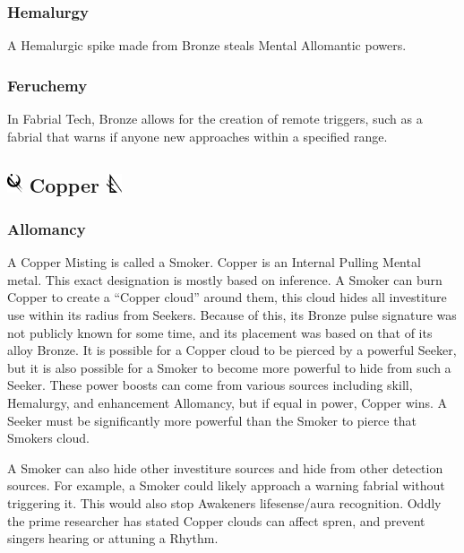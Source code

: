 \documentclass[conference]{IEEEtran}
\begin{document}
\subsubsection*{\textbf{Hemalurgy}}
A Hemalurgic spike made from Bronze steals Mental Allomantic powers.\cite{HE-TB}\\
\subsubsection*{\textbf{Feruchemy}}
In Fabrial Tech, Bronze allows for the creation of remote triggers,\cite{RoW-E8}  such as a fabrial that warns if anyone new approaches within a specified range.\cite{WoR-I4}\clearpage
\subsection*{\includegraphics[height=1em]{images/Copper.png}  \textbf{Copper} \includegraphics[height=1em]{images/Copper_(Feruchemy).png}}
\subsubsection*{\textbf{Allomancy}}
A Copper Misting is called a Smoker.\cite{ARS}  Copper is an Internal Pulling Mental metal.\cite{AL-TB}  This exact designation is mostly based on inference.  A Smoker can burn Copper to create a ``Copper cloud'' around them, this cloud hides all investiture use within its radius from Seekers.\cite{ARS}  Because of this, its Bronze pulse signature was not publicly known for some time, and its placement was based on that of its alloy Bronze.\cite{TFE-CH20}\cite{TFE-CH7}
It is possible for a Copper cloud to be pierced by a powerful Seeker,\cite{TFE-CH31} but it is also possible for a Smoker to become more powerful to hide from such a Seeker.\cite{TFE-CH31}  These power boosts can come from various sources including skill, Hemalurgy, and enhancement Allomancy, but if equal in power, Copper wins.  A Seeker must be significantly more powerful than the Smoker to pierce that Smokers cloud.\cite{TFE-CH31}

A Smoker can also hide other investiture sources and hide from other detection sources.\cite{seeker-spren}  For example, a Smoker could likely approach a warning fabrial without triggering it.  This would also stop Awakeners lifesense/aura recognition.\cite{life-block}  Oddly the prime researcher has stated Copper clouds can affect spren,\cite{copper-spren} and prevent singers hearing or attuning a Rhythm.\cite{rythm-block}
\end{document}
